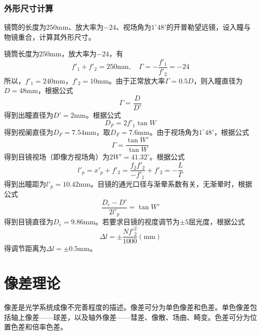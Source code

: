 \documentclass[cn,10pt,chinesefont=founder,math=mtpro2,cite=super,toc=onecol,twoside,openany]{elegantbook}
\begin{document}
\subsection{外形尺寸计算}
\begin{problem}
	\textbf{\color{red}{（重点）}}镜筒的长度为$250\mathrm{mm}$、放大率为$-24$、视场角为$1^{\circ}48'$的开普勒望远镜，设入瞳与物镜重合，计算其外形尺寸。
\end{problem}
\begin{solution}
	镜筒长度为$250\mathrm{mm}$，放大率为$-24$，有
	\begin{equation}
	f'_1+f'_2=250\mathrm{mm},\quad \varGamma=-\frac{f'_1}{f'_2}=-24 \nonumber
	\end{equation}
	所以，$f'_1=240\mathrm{mm}$，$f'_2=10\mathrm{mm}$。由于正常放大率$\varGamma=0.5D$，则入瞳直径为$D=48\mathrm{mm}$，根据公式
	\begin{equation}
	\varGamma=\frac{D}{D'} \nonumber
	\end{equation}
	得到出瞳直径为$D'=2\mathrm{mm}$。根据公式
	\begin{equation}
	D_F=2f'_1\tan W \nonumber
	\end{equation}
	得到视阑直径为$D_F=7.54\mathrm{mm}$，取$D_F=7.6\mathrm{mm}$。由于视场角为$1^{\circ}48'$，根据公式
	\begin{equation}
	\varGamma=\frac{\tan W'}{\tan W} \nonumber
	\end{equation}
	得到目镜视场（即像方视场角）为$2W'=41.32^{\circ}$。根据公式
	\begin{equation}
	l'_p=x'_p+f'_2=\frac{f_2f'_2}{-f'_1}+f'_2=-\frac{L}{\varGamma} \nonumber
	\end{equation}
	得到出瞳距为$l'_p=10.42\mathrm{mm}$。目镜的通光口径与渐晕系数有关，无渐晕时，根据公式
	\begin{equation}
	\frac{D_e-D'}{2l'_p}=\tan W' \nonumber
	\end{equation}
	得到目镜直径为$D_e=9.86\mathrm{mm}$。若要求目镜的视度调节为$\pm5$屈光度，根据公式
	\begin{equation}
	\Delta l=\pm\frac{Nf'^2_2}{1000}(\mathrm{mm}) \nonumber
	\end{equation}
	得调节距离为$\Delta l=\pm0.5\mathrm{mm}$。
\end{solution}

\chapter{像差理论}
像差是光学系统成像不完善程度的描述。像差可分为单色像差和色差。单色像差包括轴上像差——球差，以及轴外像差——彗差、像散、场曲、畸变。色差可分为位置色差和倍率色差。
\end{document}
